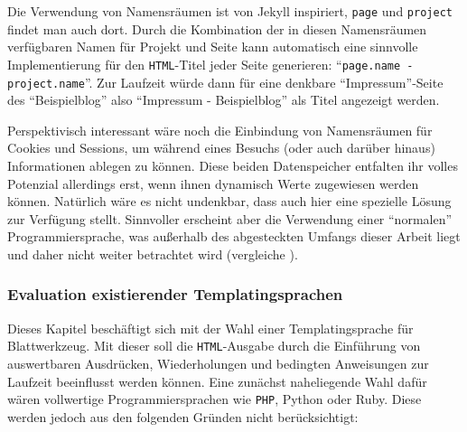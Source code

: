 Die Verwendung von Namensräumen ist von Jekyll inspiriert, \texttt{page} und \texttt{project} findet man auch dort. Durch die Kombination der in diesen Namensräumen verfügbaren Namen für Projekt und Seite kann \idename{} automatisch eine sinnvolle Implementierung für den \texttt{HTML}-Titel jeder Seite generieren: "`\texttt{page.name - project.name}"'. Zur Laufzeit würde dann für eine denkbare "`Impressum"'-Seite des "`Beispielblog"' also "`Impressum - Beispielblog"' als Titel angezeigt werden.

Perspektivisch interessant wäre noch die Einbindung von Namensräumen für Cookies und Sessions, um während eines Besuchs (oder auch darüber hinaus) Informationen ablegen zu können. Diese beiden Datenspeicher entfalten ihr volles Potenzial allerdings erst, wenn ihnen dynamisch Werte zugewiesen werden können. Natürlich wäre es nicht undenkbar, dass \idename{} auch hier eine spezielle Lösung zur Verfügung stellt. Sinnvoller erscheint aber die Verwendung einer "`normalen"' Programmiersprache, was außerhalb des abgesteckten Umfangs dieser Arbeit liegt und daher nicht weiter betrachtet wird (vergleiche ).

\subsubsection{Evaluation existierender Templatingsprachen}
\label{sec:eval-templating-language}

Dieses Kapitel beschäftigt sich mit der Wahl einer Templatingsprache für Blattwerkzeug. Mit dieser soll die \texttt{HTML}-Ausgabe durch die Einführung von auswertbaren Ausdrücken, Wiederholungen und bedingten Anweisungen zur Laufzeit beeinflusst werden können. Eine zunächst naheliegende Wahl dafür wären vollwertige Programmiersprachen wie \texttt{PHP}, Python oder Ruby. Diese werden jedoch aus den folgenden Gründen nicht berücksichtigt:

